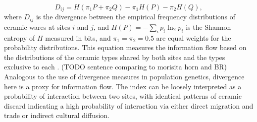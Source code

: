 \documentclass[10pt]{iopart}
\begin{document}
\begin{equation}
    D_{ij} = H\left(\pi_1P + \pi_2Q\right) - \pi_1H(P) - \pi_2H(Q),
\end{equation}
where $D_{ij}$ is the divergence between the empirical frequency distributions of ceramic wares at sites $i$ and $j$, and $H(P) = -\sum_i p_i \ln_2 p_i$ is the Shannon entropy of $H$ measured in bits, and $\pi_1 = \pi_2 = 0.5$ are equal weights for the probability distributions. This equation measures the information flow based on the distributions of the ceramic types shared by both sites and the types exclusive to each \parencite{Masucci2011}. (TODO sentence comparing to morisita horn and BR) Analogous to the use of divergence measures in population genetics, divergence here is a proxy for information flow. The index can be loosely interpreted as a probability of interaction between two sites, with identical patterns of ceramic discard indicating a high probability of interaction via either direct migration and trade or indirect cultural diffusion.
\end{document}
